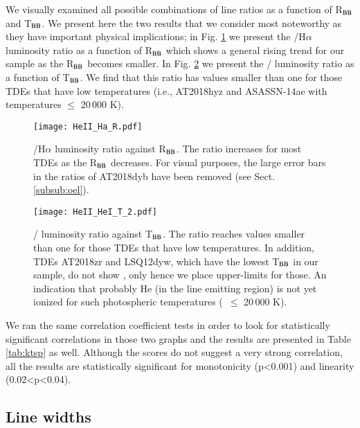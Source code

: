 \documentclass[structabstract]{aa}
\begin{document}
We visually examined all possible combinations of line ratios as a function of R$_{\rm BB}$ and T$_{\rm BB}$. We present here the two results that we consider most noteworthy as they have important physical implications; in Fig. \ref{fig:HeII_Ha_R} we present the /H$\alpha$ luminosity ratio as a function of R$_{\rm BB}$ which shows a general rising trend for our sample as the R$_{\rm BB}$ becomes smaller. In Fig. \ref{fig:HeII_HeI_T} we present the / luminosity ratio as a function of T$_{\rm BB}$. We find that this ratio has values smaller than one for those TDEs that have low temperatures (i.e., AT2018hyz and ASASSN-14ae with temperatures $\leq$ 20\,000 K). 


\begin{figure}
\centering
\texttt{[image: HeII\_Ha\_R.pdf]}
\caption{/H$\alpha$ luminosity ratio against R$_{\rm BB}$. The ratio increases for most TDEs as the R$_{\rm BB}$ decreases. For visual purposes, the large error bars in the  ratios of AT2018dyb have been removed (see Sect. \ref{subsub:oel}).}
\label{fig:HeII_Ha_R}
\end{figure}

\begin{figure}
\centering
\texttt{[image: HeII\_HeI\_T\_2.pdf]}
\caption{/ luminosity ratio against T$_{\rm BB}$. The ratio reaches values smaller than one for those TDEs that have low temperatures. In addition, TDEs AT2018zr and LSQ12dyw, which have the lowest T$_{\rm BB}$ in our sample, do not show , only  hence we place upper-limits for those. An indication that probably He (in the line emitting region) is not yet ionized for such photospheric temperatures (~$\leq$ 20\,000 K).}
\label{fig:HeII_HeI_T}
\end{figure}



We ran the same correlation coefficient tests in order to look for statistically significant correlations in those two graphs and the results are presented in Table \ref{tab:ktsp} as well. Although the scores do not suggest a very strong correlation, all the results are statistically significant for monotonicity (p<0.001) and linearity (0.02<p<0.04). 



\subsection{Line widths} \label{sub:lw}
\end{document}
